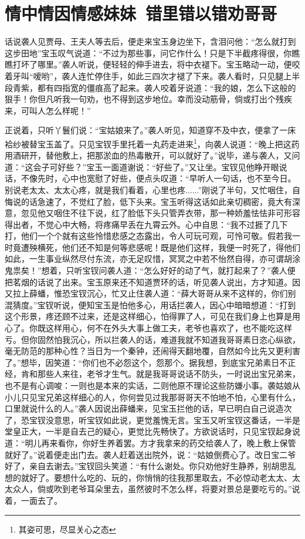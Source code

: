 \documentclass[12pt,oneside]{book}
\begin{document}
 
\chapter{情中情因情感妹妹~错里错以错劝哥哥}
话说袭人见贾母、王夫人等去后，便走来宝玉身边坐下，含泪问他：“怎么就打到这步田地”宝玉叹气说道：“不过为那些事，问它作什么！只是下半截疼得很，你瞧瞧打坏了哪里。”袭人听说，便轻轻的伸手进去，将中衣褪下。宝玉略动一动，便咬着牙叫“嗳哟”，袭人连忙停住手，如此三四次才褪了下来。袭人看时，只见腿上半段青紫，都有四指宽的僵痕高了起来。袭人咬着牙说道：“我的娘，怎么下这般的狠手！你但凡听我一句劝，也不得到这步地位。幸而没动筋骨，倘或打出个残疾来，可叫人怎么样呢！”

正说着，只听丫鬟们说：“宝姑娘来了。”袭人听见，知道穿不及中衣，便拿了一床袷纱被替宝玉盖了。只见宝钗手里托着一丸药走进来\footnote{其姿可思，尽显关心之态}，向袭人说道：“晚上把这药用酒研开，替他敷上，把那淤血的热毒散开，可以就好了。”说毕，递与袭人，又问道：“这会子可好些？”宝玉一面道谢说：“好些了。”又让坐。宝钗见他睁开眼说话，不像先时，心中也宽慰了好些，便点头叹道：“早听人一句话，也不至今日。别说老太太、太太心疼，就是我们看着，心里也疼......”刚说了半句，又忙咽住，自悔说的话急速了，不觉红了脸，低下头来。宝玉听得这话如此亲切稠密，竟大有深意，忽见他又咽住不往下说，红了脸低下头只管弄衣带，那一种娇羞怯怯非可形容得出者，不觉心中大畅，将疼痛早丢在九霄云外。心中自思：“我不过捱了几下打，他们一个个就有这些怜惜悲感之态露出，令人可玩可观，可怜可敬。假若我一时竟遭殃横死，他们还不知是何等悲感呢！既是他们这样，我便一时死了，得他们如此，一生事业纵然尽付东流，亦无足叹惜，冥冥之中若不怡然自得，亦可谓胡涂鬼祟矣！”想着，只听宝钗问袭人道：“怎么好好的动了气，就打起来了？”袭人便把茗烟的话说了出来。宝玉原来还不知道贾环的话，听见袭人说出，方才知道。因又拉上薛蟠，惟恐宝钗沉心，忙又止住袭人道：“薛大哥哥从来不这样的，你们别混猜度。”宝钗听说，便知宝玉是怕他多心，用话拦袭人，因心中暗暗想道：“打到这个形景，疼还顾不过来，还是这样细心，怕得罪了人，可见在我们身上也算是用心了。你既这样用心，何不在外头大事上做工夫，老爷也喜欢了，也不能吃这样亏。但你固然怕我沉心，所以拦袭人的话，难道我就不知道我哥哥素日恣心纵欲，毫无防范的那种心性？当日为一个秦钟，还闹得天翻地覆，自然如今比先又更利害了。”想毕，因笑道：“你们也不必怨这个，怨那个。据我想，到底宝兄弟素日不正经，肯和那些人来往，老爷才生气。就是我哥哥说话不防头，一时说出宝兄弟来，也不是有心调唆：一则也是本来的实话，二则他原不理论这些防嫌小事。袭姑娘从小儿只见宝兄弟这样细心的人，你何尝见过我那哥哥天不怕地不怕，心里有什么，口里就说什么的人。”袭人因说出薛蟠来，见宝玉拦他的话，早已明白自己说造次了，恐宝钗没意思，听宝钗如此说，更觉羞愧无言。宝玉又听宝钗这番话，一半是堂皇正大，一半是自去己的疑心，更觉比先畅快了。方欲说话时，只见宝钗起身说道：“明儿再来看你，你好生养着罢。方才我拿来的药交给袭人了，晚上敷上保管就好了。”说着便走出门去。袭人赶着送出院外，说：“姑娘倒费心了。改日宝二爷好了，亲自去谢去。”宝钗回头笑道：“有什么谢处。你只劝他好生静养，别胡思乱想的就好了。要想什么吃的、玩的，你悄悄的往我那里取去，不必惊动老太太、太太众人，倘或吹到老爷耳朵里去，虽然彼时不怎么样，将要对景总是要吃亏的。”说着，一面去了。
\end{document}
